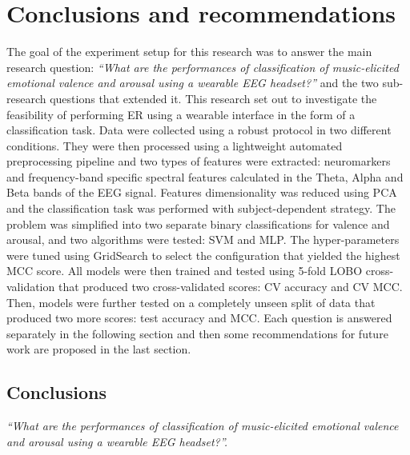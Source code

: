 \chapter{Conclusions and recommendations}
\label{chap:conclusions}
The goal of the experiment setup for this research was to answer the main research question: \emph{“What are the performances of classification of music-elicited emotional valence and arousal using a wearable EEG headset?”} and the two sub-research questions that extended it. This research set out to investigate the feasibility of performing \ac{ER} using a wearable interface in the form of a classification task. Data were collected using a robust protocol in two different conditions. They were then processed using a lightweight automated preprocessing pipeline and two types of features were extracted: neuromarkers and frequency-band specific spectral features calculated in the Theta, Alpha and Beta bands of the \ac{EEG} signal. Features dimensionality was reduced using \ac{PCA} and the classification task was performed with subject-dependent strategy. The problem was simplified into two separate binary classifications for valence and arousal, and two algorithms were tested: \ac{SVM} and \ac{MLP}. The hyper-parameters were tuned using GridSearch to select the configuration that yielded the highest \ac{MCC} score. All models were then trained and tested using 5-fold \ac{LOBO} cross-validation that produced two cross-validated scores: \ac{CV} accuracy and \ac{CV MCC}. Then, models were further tested on a completely unseen split of data that produced two more scores: test accuracy and \ac{MCC}. Each question is answered separately in the following section and then some recommendations for future work are proposed in the last section.
\section{Conclusions}
\label{sec:conclusions}
\emph{“What are the performances of classification of music-elicited emotional valence and arousal using a wearable EEG headset?”. }

